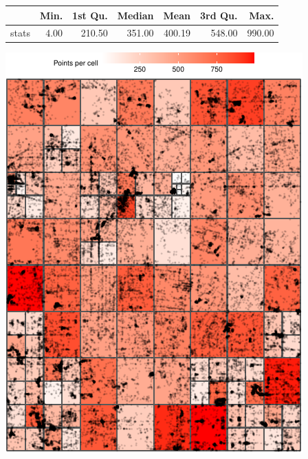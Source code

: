 \documentclass[
  9pt,
  landscape]{article}
\begin{document}
\begin{minipage}{0.5\textwidth} 
\centering 
\begin{tabular}{rrrrrrr}
  \hline
 & Min. & 1st Qu. & Median & Mean & 3rd Qu. & Max. \\ 
  \hline
stats & 4.00 & 210.50 & 351.00 & 400.19 & 548.00 & 990.00 \\ 
   \hline
\end{tabular}
\vspace{0.5cm} 


\includegraphics[width=1\linewidth,height=0.8\textheight]{distance_files/figure-latex/p1_318_1000_4-1} 

\end{minipage} 
\end{document}

